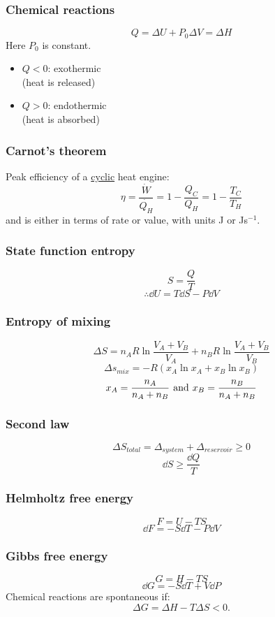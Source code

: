 \documentclass{article}
\begin{document}
\begin{multicols*}{3}
\subsubsection*{Chemical reactions}
$$Q=\Delta U+P_0\Delta V=\Delta H$$
Here $P_0$ is constant.
\begin{itemize}
    \item $Q<0$: exothermic \\
    (heat is released)
    \item $Q>0$: endothermic \\
    (heat is absorbed)
\end{itemize}

\subsubsection*{Carnot's theorem}
Peak efficiency of a \underline{cyclic}
heat engine:
$$\eta=\frac{\dot{W}}{\dot{Q_H}}=1-\frac{Q_C}{Q_H}
=1-\frac{T_C}{T_H}$$
and is either in terms of rate or value, 
with units J or Js$^{-1}$.

\subsubsection*{State function entropy}
$$S=\frac{Q}{T}$$
$$\therefore\dd U=T\dd S-P\dd V$$

\subsubsection*{Entropy of mixing}
$$\Delta S=n_A R\ln\frac{V_A+V_B}{V_A}
+n_B R\ln\frac{V_A+V_B}{V_B}$$
$$\Delta s_{mix}=-R(x_A\ln x_A+x_B\ln x_B)$$
$$x_A=\frac{n_A}{n_A+n_B}
\hspace{0.05in}\text{and}\hspace{0.05in}
x_B=\frac{n_B}{n_A+n_B}$$

\subsubsection*{Second law}
$$\Delta S_{total}=\Delta_{system}
+\Delta_{reservoir}\geq0$$
$$\dd S\geq\frac{\dd Q}{T}$$

\subsubsection*{Helmholtz free energy}
$$F=U-TS$$
$$\dd F=-S\dd T-P\dd V$$

\subsubsection*{Gibbs free energy}
$$G=H-TS$$
$$\dd G=-S\dd T+V\dd P$$
Chemical reactions are spontaneous if:
$$\Delta G=\Delta H-T\Delta S<0.$$


\end{multicols*}
\end{document}
